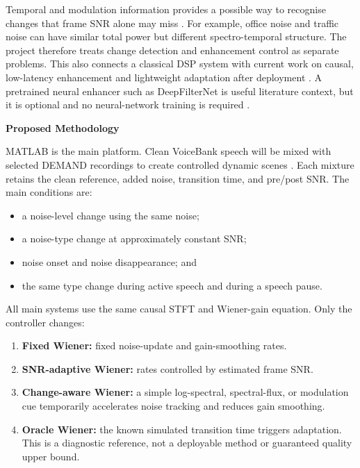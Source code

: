 \documentclass[11pt,a4paper]{article}
\newcommand{\projectsection}[1]{%
  \vspace{0.25em}%
  {\large\bfseries\color{accent} #1}\par
  \vspace{0.1em}%
}
\begin{document}
Temporal and modulation information provides a possible way to recognise changes that frame SNR alone may miss \cite{paliwal2009}. For example, office noise and traffic noise can have similar total power but different spectro-temporal structure. The project therefore treats change detection and enhancement control as separate problems. This also connects a classical DSP system with current work on causal, low-latency enhancement and lightweight adaptation after deployment \cite{wu2025,cheng2026}. A pretrained neural enhancer such as DeepFilterNet is useful literature context, but it is optional and no neural-network training is required \cite{deepfilternet2023}.

\projectsection{Proposed Methodology}

MATLAB is the main platform. Clean VoiceBank speech will be mixed with selected DEMAND recordings to create controlled dynamic scenes \cite{voicebank2017,demand2013}. Each mixture retains the clean reference, added noise, transition time, and pre/post SNR. The main conditions are:

\begin{itemize}
  \item a noise-level change using the same noise;
  \item a noise-type change at approximately constant SNR;
  \item noise onset and noise disappearance; and
  \item the same type change during active speech and during a speech pause.
\end{itemize}

All main systems use the same causal STFT and Wiener-gain equation. Only the controller changes:

\begin{enumerate}
  \item \textbf{Fixed Wiener:} fixed noise-update and gain-smoothing rates.
  \item \textbf{SNR-adaptive Wiener:} rates controlled by estimated frame SNR.
  \item \textbf{Change-aware Wiener:} a simple log-spectral, spectral-flux, or modulation cue temporarily accelerates noise tracking and reduces gain smoothing.
  \item \textbf{Oracle Wiener:} the known simulated transition time triggers adaptation. This is a diagnostic reference, not a deployable method or guaranteed quality upper bound.
\end{enumerate}
\end{document}
